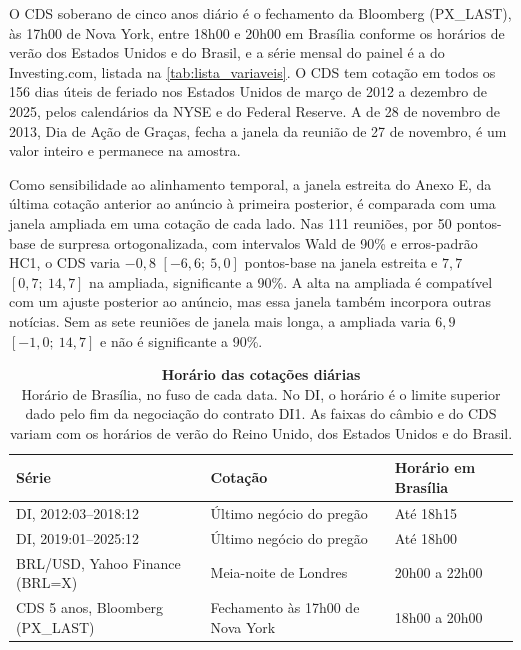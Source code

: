 \documentclass[preprint,authoryear,review,12pt]{elsarticle}
\begin{document}
O CDS soberano de cinco anos diário é o fechamento da Bloomberg (PX\_LAST), às 17h00 de Nova York, entre 18h00 e 20h00 em Brasília conforme os horários de verão dos Estados Unidos e do Brasil, e a série mensal do painel é a do Investing.com, listada na \autoref{tab:lista_variaveis}. O CDS tem cotação em todos os 156 dias úteis de feriado nos Estados Unidos de março de 2012 a dezembro de 2025, pelos calendários da NYSE e do Federal Reserve. A de 28 de novembro de 2013, Dia de Ação de Graças, fecha a janela da reunião de 27 de novembro, é um valor inteiro e permanece na amostra.

Como sensibilidade ao alinhamento temporal, a janela estreita do Anexo E, da última cotação anterior ao anúncio à primeira posterior, é comparada com uma janela ampliada em uma cotação de cada lado. Nas 111 reuniões, por 50 pontos-base de surpresa ortogonalizada, com intervalos Wald de 90\% e erros-padrão HC1, o CDS varia $-0{,}8$ $[-6{,}6;\ 5{,}0]$ pontos-base na janela estreita e $7{,}7$ $[0{,}7;\ 14{,}7]$ na ampliada, significante a 90\%. A alta na ampliada é compatível com um ajuste posterior ao anúncio, mas essa janela também incorpora outras notícias. Sem as sete reuniões de janela mais longa, a ampliada varia $6{,}9$ $[-1{,}0;\ 14{,}7]$ e não é significante a 90\%.

\begin{table}[H]
\centering
\footnotesize
\begin{tabular}{@{}l l l@{}}
\toprule
Série & Cotação & Horário em Brasília \\
\midrule
DI, 2012:03--2018:12                & Último negócio do pregão          & Até 18h15 \\
DI, 2019:01--2025:12                & Último negócio do pregão          & Até 18h00 \\
BRL/USD, Yahoo Finance (BRL=X)      & Meia-noite de Londres             & 20h00 a 22h00 \\
CDS 5 anos, Bloomberg (PX\_LAST)    & Fechamento às 17h00 de Nova York  & 18h00 a 20h00 \\
\bottomrule
\end{tabular}
\caption{\textbf{Horário das cotações diárias}\\{Horário de Brasília, no fuso de cada data. No DI, o horário é o limite superior dado pelo fim da negociação do contrato DI1. As faixas do câmbio e do CDS variam com os horários de verão do Reino Unido, dos Estados Unidos e do Brasil.}}
\label{tab:horarios}
\end{table}
\end{document}
